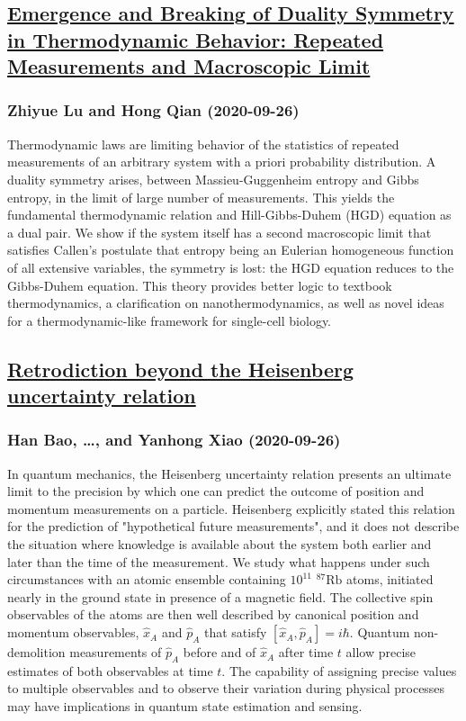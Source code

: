 \subsection*{\href{http://arxiv.org/abs/2009.12644v1}{Emergence and Breaking of Duality Symmetry in Thermodynamic Behavior:  Repeated Measurements and Macroscopic Limit}}
\subsubsection*{Zhiyue Lu and Hong Qian (2020-09-26)}
Thermodynamic laws are limiting behavior of the statistics of repeated
measurements of an arbitrary system with a priori probability distribution. A
duality symmetry arises, between Massieu-Guggenheim entropy and Gibbs entropy,
in the limit of large number of measurements. This yields the fundamental
thermodynamic relation and Hill-Gibbs-Duhem (HGD) equation as a dual pair. We
show if the system itself has a second macroscopic limit that satisfies
Callen's postulate that entropy being an Eulerian homogeneous function of all
extensive variables, the symmetry is lost: the HGD equation reduces to the
Gibbs-Duhem equation. This theory provides better logic to textbook
thermodynamics, a clarification on nanothermodynamics, as well as novel ideas
for a thermodynamic-like framework for single-cell biology.

\subsection*{\href{http://arxiv.org/abs/2009.12642v1}{Retrodiction beyond the Heisenberg uncertainty relation}}
\subsubsection*{Han Bao, \dots, and Yanhong Xiao (2020-09-26)}
In quantum mechanics, the Heisenberg uncertainty relation presents an
ultimate limit to the precision by which one can predict the outcome of
position and momentum measurements on a particle. Heisenberg explicitly stated
this relation for the prediction of "hypothetical future measurements", and it
does not describe the situation where knowledge is available about the system
both earlier and later than the time of the measurement. We study what happens
under such circumstances with an atomic ensemble containing $10^{11}$
$^{87}\text{Rb}$ atoms, initiated nearly in the ground state in presence of a
magnetic field. The collective spin observables of the atoms are then well
described by canonical position and momentum observables, $\hat{x}_A$ and
$\hat{p}_A$ that satisfy $[\hat{x}_A,\hat{p}_A]=i\hbar$. Quantum non-demolition
measurements of $\hat{p}_A$ before and of $\hat{x}_A$ after time $t$ allow
precise estimates of both observables at time $t$. The capability of assigning
precise values to multiple observables and to observe their variation during
physical processes may have implications in quantum state estimation and
sensing.

